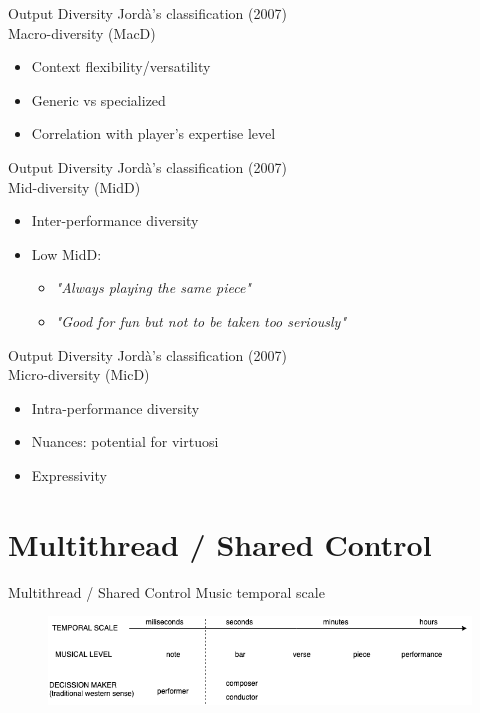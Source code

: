 \documentclass{beamer}
\begin{document}
\begin{frame}{Output Diversity}
    Jordà's classification (2007)\\
    \vspace{5mm}
    Macro-diversity (MacD)
    \begin{itemize}
        \item Context flexibility/versatility
        \item Generic vs specialized 
        \item Correlation with player's expertise level
    \end{itemize}
\end{frame}

\begin{frame}{Output Diversity}
    Jordà's classification (2007)\\
    \vspace{5mm}
    Mid-diversity (MidD)
    \begin{itemize}
        \item Inter-performance diversity
        \item Low MidD: 
        \begin{itemize}
            \item \textit{"Always playing the same piece"}
            \item \textit{"Good for fun but not to be taken too seriously"}
        \end{itemize} 
    \end{itemize}
\end{frame}


\begin{frame}{Output Diversity}
    Jordà's classification (2007)\\
    \vspace{5mm}
    Micro-diversity (MicD)
    \begin{itemize}
        \item Intra-performance diversity
        \item Nuances: potential for virtuosi
        \item Expressivity
    \end{itemize}
\end{frame}



\section{Multithread / Shared Control}

\begin{frame}{Multithread / Shared Control}
    Music temporal scale
    \begin{figure}[h]
        \includegraphics[width=\textwidth]{temporal_scale.png}
    \end{figure}
\end{frame}
\end{document}
